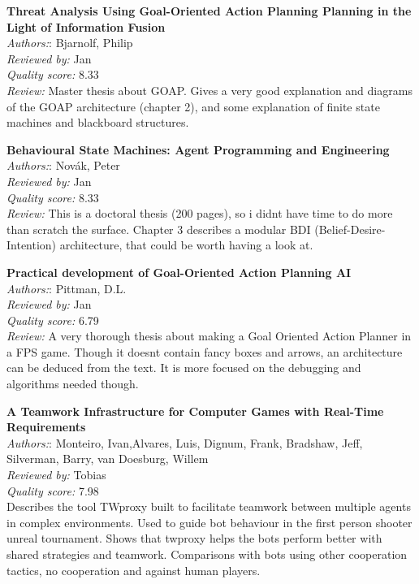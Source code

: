 \textbf{Threat Analysis Using Goal-Oriented Action Planning Planning in the Light of Information Fusion}\\
\textit{Authors:}: Bjarnolf, Philip\\
\textit{Reviewed by:} Jan\\
\textit{Quality score:} 8.33\\
\textit{Review:} Master thesis about GOAP. Gives a very good explanation and diagrams of the GOAP architecture (chapter 2), and some explanation of finite state machines and blackboard structures. 

\textbf{Behavioural State Machines: Agent Programming and Engineering}\\
\textit{Authors:}: Nov\'{a}k, Peter\\
\textit{Reviewed by:} Jan\\
\textit{Quality score:} 8.33\\
\textit{Review:} This is a doctoral thesis (200 pages), so i didnt have time to do more than scratch the surface. Chapter 3 describes a modular BDI (Belief-Desire-Intention) architecture, that could be worth having a look at.


\textbf{Practical development of Goal-Oriented Action Planning AI}\\
\textit{Authors:}: Pittman, D.L.\\
\textit{Reviewed by:} Jan\\
\textit{Quality score:} 6.79\\
\textit{Review:} A very thorough thesis about making a Goal Oriented Action Planner in a FPS game. Though it doesnt contain fancy boxes and arrows, an architecture can be deduced from the text. It is more focused on the debugging and algorithms needed though.

\textbf{A Teamwork Infrastructure for Computer Games with Real-Time Requirements}\\
\textit{Authors:}: Monteiro, Ivan,Alvares, Luis, Dignum, Frank, Bradshaw, Jeff, Silverman, Barry, van Doesburg, Willem\\
\textit{Reviewed by:} Tobias\\
\textit{Quality score:} 7.98\\
Describes the tool TWproxy built to facilitate teamwork between multiple agents in complex environments. Used to guide bot behaviour in the first person shooter unreal tournament. Shows that twproxy helps the bots perform better with shared strategies and teamwork. Comparisons with bots using other cooperation tactics, no cooperation and against human players.

